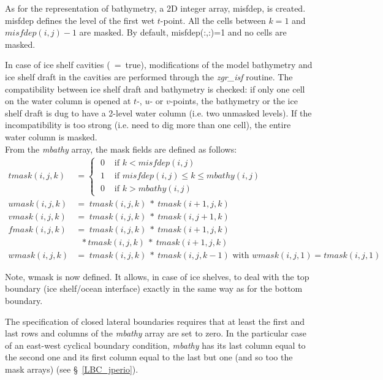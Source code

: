\documentclass[NEMO_book]{subfiles}
\begin{document}
As for the representation of bathymetry, a 2D integer array, misfdep, is created. 
misfdep defines the level of the first wet $t$-point. All the cells between $k=1$ and $misfdep(i,j)-1$ are masked. 
By default, misfdep(:,:)=1 and no cells are masked.

In case of ice shelf cavities (~=~true), modifications of the model bathymetry and ice shelf draft in 
the cavities are performed through the \textit{zgr\_isf} routine. The compatibility between ice shelf draft and bathymetry is checked: 
if only one cell on the water column is opened at $t$-, $u$- or $v$-points, the bathymetry or the ice shelf draft is dug to have a 2-level water column 
(i.e. two unmasked levels). If the incompatibility is too strong (i.e. need to dig more than one cell), the entire water column is masked.\\ 

From the \textit{mbathy} array, the mask fields are defined as follows:
\begin{align*}
tmask(i,j,k) &= \begin{cases}   \; 0&   \text{ if $k < misfdep(i,j) $ } \\
                                \; 1&   \text{ if $misfdep(i,j) \leq k\leq mbathy(i,j)$  }    \\
                                \; 0&   \text{ if $k > mbathy(i,j)$  }    \end{cases}     \\
umask(i,j,k) &=         \; tmask(i,j,k) \ * \ tmask(i+1,j,k)	\\
vmask(i,j,k) &=         \; tmask(i,j,k) \ * \ tmask(i,j+1,k)	\\
fmask(i,j,k) &=         \; tmask(i,j,k) \ * \ tmask(i+1,j,k)	\\
                   & \ \ \, * tmask(i,j,k) \ * \ tmask(i+1,j,k) \\
wmask(i,j,k) &=         \; tmask(i,j,k) \ * \ tmask(i,j,k-1) \text{ with } wmask(i,j,1) = tmask(i,j,1) 
\end{align*}

Note, wmask is now defined. It allows, in case of ice shelves, 
to deal with the top boundary (ice shelf/ocean interface) exactly in the same way as for the bottom boundary. 

The specification of closed lateral boundaries requires that at least the first and last 
rows and columns of the \textit{mbathy} array are set to zero. In the particular 
case of an east-west cyclical boundary condition, \textit{mbathy} has its last 
column equal to the second one and its first column equal to the last but one 
(and so too the mask arrays) (see \S~\ref{LBC_jperio}).
\end{document}

